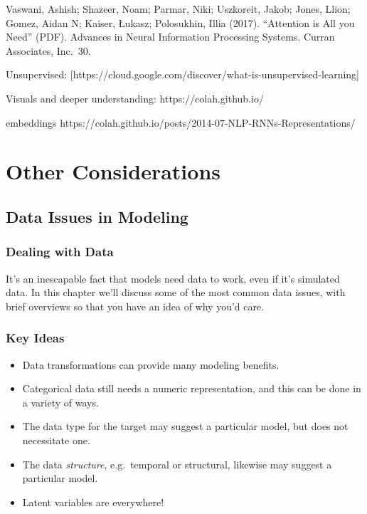 \documentclass[
  letterpaper,
]{krantz}
\providecommand{\tightlist}{%
  \setlength{\itemsep}{0pt}\setlength{\parskip}{0pt}}\usepackage{longtable,booktabs,array}
\begin{document}
Vaswani, Ashish; Shazeer, Noam; Parmar, Niki; Uszkoreit, Jakob; Jones,
Llion; Gomez, Aidan N; Kaiser, Łukasz; Polosukhin, Illia (2017).
``Attention is All you Need'' (PDF). Advances in Neural Information
Processing Systems. Curran Associates, Inc.~30.

Unsupervised:
{[}https://cloud.google.com/discover/what-is-unsupervised-learning{]}

Visuals and deeper understanding: https://colah.github.io/

embeddings
https://colah.github.io/posts/2014-07-NLP-RNNs-Representations/

\part{Other Considerations}

\chapter{Data Issues in Modeling}\label{data-issues-in-modeling}

\section{Dealing with Data}\label{dealing-with-data}

It's an inescapable fact that models need data to work, even if it's
simulated data. In this chapter we'll discuss some of the most common
data issues, with brief overviews so that you have an idea of why you'd
care.

\section{Key Ideas}\label{key-ideas-6}

\begin{itemize}
\tightlist
\item
  Data transformations can provide many modeling benefits.
\item
  Categorical data still needs a numeric representation, and this can be
  done in a variety of ways.
\item
  The data type for the target may suggest a particular model, but does
  not necessitate one.
\item
  The data \emph{structure}, e.g.~temporal or structural, likewise may
  suggest a particular model.
\item
  Latent variables are everywhere!
\end{itemize}
\end{document}
